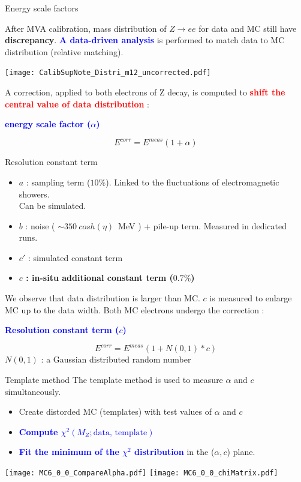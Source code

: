 \begin{frame}{Energy scale factors}
  \begin{minipage}{0.49\linewidth}
    After MVA calibration, mass distribution of $Z\rightarrow ee$ for data and MC still have {\bf discrepancy}.
    \newline
    \textcolor{blue}{\bf A data-driven analysis } is performed to match data to MC distribution (relative matching).
  \end{minipage}
  \hfill
  \begin{minipage}{0.49\linewidth}
    \texttt{[image: CalibSupNote\_Distri\_m12\_uncorrected.pdf]}
  \end{minipage}

A correction, applied to both electrons of Z decay, is computed to \textcolor{red}{\bf shift the central value of data distribution} : 
\begin{center} \textcolor{blue}{\bf energy scale factor ($\alpha$)} \end{center}
$$E^{corr}=E^{meas}(1+\alpha)$$
\end{frame}

\begin{frame}{Resolution constant term}
  
  \begin{itemize}
  \item $a$ : sampling term ($10\%$). Linked to the fluctuations of electromagnetic showers. \\Can be simulated.
  \item $b$ : noise  ( $\sim 350~cosh(\eta )$~MeV ) + pile-up term. Measured in dedicated runs.
  \item $c'$ : simulated constant term
  \item {\bf $c$ : in-situ additional constant term ($0.7\%$)}
  \end{itemize}
  We observe that data distribution is larger than MC. 
  $c$ is measured to enlarge MC up to the data width.
  Both MC electrons undergo the correction :
  \begin{center}\textcolor{blue}{\bf Resolution constant term ($c$) }\end{center}
  $$E^{corr} = E^{meas}(1+N(0,1)*c)$$
  $N(0,1)$ : a Gaussian distributed random number
\end{frame}

\begin{frame}{Template method}
  The template method is used to measure $\alpha$ and $c$ simultaneously.
  \begin{itemize}
  \item Create distorded MC (templates) with test values of $\alpha$ and $c$
  \item \textcolor{blue}{\bf Compute $\chi^2( M_Z; \text{data, template})$}
  \item \textcolor{blue}{\bf Fit the minimum of the $\chi^2$ distribution} in the ($\alpha,c$) plane.
  \end{itemize}
  \hfill
  \texttt{[image: MC6\_0\_0\_CompareAlpha.pdf]}
  \texttt{[image: MC6\_0\_0\_chiMatrix.pdf]}
\end{frame}

